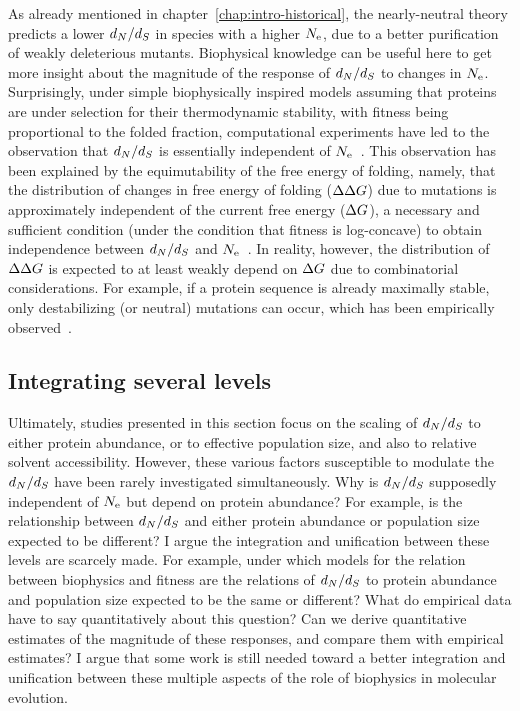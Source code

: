 As already mentioned in chapter~\ref{chap:intro-historical}, the nearly-neutral theory predicts a lower $d_N / d_S$ in species with a higher $N_{\text{e}}$, due to a better purification of weakly deleterious mutants.
Biophysical knowledge can be useful here to get more insight about the magnitude of the response of $d_N / d_S$ to changes in $N_{\text{e}}$.
Surprisingly, under simple biophysically inspired models assuming that proteins are under selection for their thermodynamic stability, with fitness being proportional to the folded fraction, computational experiments have led to the observation that $d_N / d_S$ is essentially independent of $N_{\text{e}}$~\citep{Goldstein2013}.
This observation has been explained by the equimutability of the free energy of folding, namely, that the distribution of changes in free energy of folding ($\Delta \Delta G$) due to mutations is approximately independent of the current free energy ($\Delta G$), a necessary and sufficient condition (under the condition that fitness is log-concave) to obtain independence between $d_N / d_S$ and $N_{\text{e}}$~\citep{Cherry1998}.
In reality, however, the distribution of $\Delta \Delta G$ is expected to at least weakly depend on $\Delta G$ due to combinatorial considerations.
For example, if a protein sequence is already maximally stable, only destabilizing (or neutral) mutations can occur, which has been empirically observed~\citep{Serohijos2012}.

\subsection{Integrating several levels}

Ultimately, studies presented in this section focus on the scaling of $d_N / d_S$ to either protein abundance, or to effective population size, and also to relative solvent accessibility.
However, these various factors susceptible to modulate the $d_N / d_S$ have been rarely investigated simultaneously.
Why is $d_N / d_S$ supposedly independent of $N_{\text{e}}$ but depend on protein abundance?
For example, is the relationship between $d_N / d_S$ and either protein abundance or population size expected to be different?
I argue the integration and unification between these levels are scarcely made.
For example, under which models for the relation between biophysics and fitness are the relations of $d_N / d_S$ to protein abundance and population size expected to be the same or different?
What do empirical data have to say quantitatively about this question?
Can we derive quantitative estimates of the magnitude of these responses, and compare them with empirical estimates?
I argue that some work is still needed toward a better integration and unification between these multiple aspects of the role of biophysics in molecular evolution.


